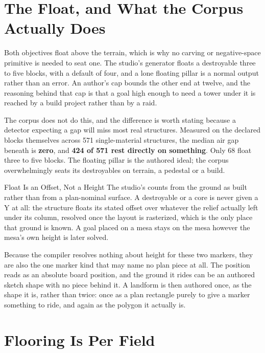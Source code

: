 \section{The Float, and What the Corpus Actually Does}

Both objectives float above the terrain, which is why no carving or negative-space
primitive is needed to seat one. The studio's generator floats a destroyable three
to five blocks, with a default of four, and a lone floating pillar is a normal
output rather than an error. An author's cap bounds the other end at twelve, and the
reasoning behind that cap is that a goal high enough to need a tower under it is
reached by a build project rather than by a raid.

The corpus does not do this, and the difference is worth stating because a detector
expecting a gap will miss most real structures. Measured on the declared blocks
themselves across 571 single-material structures, the median air gap beneath is
\textbf{zero}, and \textbf{424 of 571 rest directly on something}. Only 68 float
three to five blocks. The floating pillar is the authored ideal; the corpus
overwhelmingly seats its destroyables on terrain, a pedestal or a build.

\begin{ruling}{Float Is an Offset, Not a Height}
The studio's  counts from the ground as built rather than from a
plan-nominal surface. A destroyable or a core is never given a Y at all: the
structure floats its stated offset over whatever the relief actually left under its
column, resolved once the layout is rasterized, which is the only place that ground
is known. A goal placed on a mesa stays on the mesa however the mesa's own height is
later solved.
\end{ruling}

Because the compiler resolves nothing about height for these two markers, they are
also the one marker kind that may name no plan piece at all. The position reads as
an absolute board position, and the ground it rides can be an authored sketch shape
with no piece behind it. A landform is then authored once, as the shape it is,
rather than twice: once as a plan rectangle purely to give a marker something to
ride, and again as the polygon it actually is.

\section{Flooring Is Per Field}

